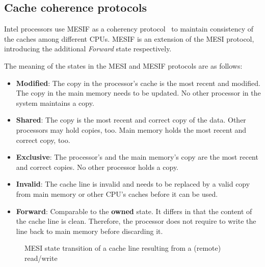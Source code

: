 \subsection{Cache coherence protocols}
\label{sec:state:technical:caches_protocol}
Intel processors
use MESIF as a coherency protocol~\cite{thomadakis2011architecture}
to maintain consistency of the caches among different CPUs.
MESIF is an extension of the MESI protocol, introducing the additional
\textit{Forward} state respectively.

The meaning of the states in the MESI and MESIF protocols are as follows:
\begin{itemize}
  \item \textbf{Modified}: The copy in the processor's cache is the most
    recent and modified. The copy in the main memory needs to be updated.
    No other processor in the system maintains a copy.
  \item \textbf{Shared}:  The copy is the most recent and correct copy of the
    data. Other processors may hold copies, too. Main memory holds the
    most recent and correct copy, too.
  \item \textbf{Exclusive}: The processor's and the main memory's copy are the
    most recent and correct copies. No other processor holds a copy.
  \item \textbf{Invalid}: The cache line is invalid and needs to be replaced by
    a valid copy from main memory or other CPU's caches before it can be used.
  \item \textbf{Forward}: Comparable to the \textbf{owned} state. It differs in
    that the content of the cache line is clean. Therefore, the processor does
    not require to write the line back to main memory before discarding it.
\end{itemize}

\begin{figure}
  \begin{center}
    
    \caption{MESI state transition of a cache line resulting from a (remote) read/write}
    \label{fig:state:technical:mesi}
  \end{center}
\end{figure}


